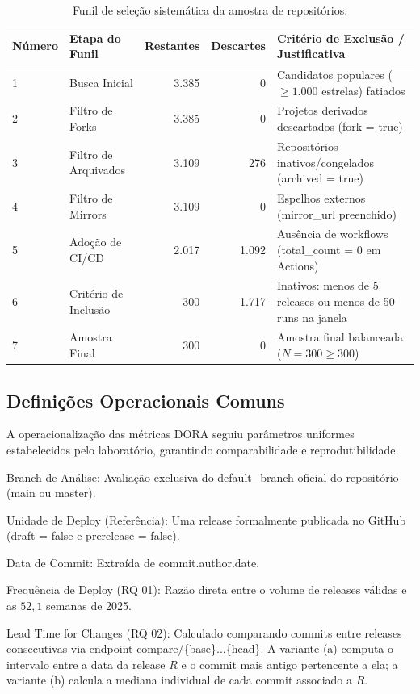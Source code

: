 \documentclass[12pt]{article}
\begin{document}
\begin{table}[htbp]
\centering
\caption{Funil de seleção sistemática da amostra de repositórios.}
\label{tab:funil}
\footnotesize
\setlength{\tabcolsep}{3pt}
\begin{tabular}{llrrp{5.5cm}}
\toprule
Número & Etapa do Funil & Restantes & Descartes & Critério de Exclusão / Justificativa \\
\midrule
1 & Busca Inicial & 3.385 & 0 & Candidatos populares ($\ge 1.000$ estrelas) fatiados \\
2 & Filtro de Forks & 3.385 & 0 & Projetos derivados descartados (fork = true) \\
3 & Filtro de Arquivados & 3.109 & 276 & Repositórios inativos/congelados (archived = true) \\
4 & Filtro de Mirrors & 3.109 & 0 & Espelhos externos (mirror\_url preenchido) \\
5 & Adoção de CI/CD & 2.017 & 1.092 & Ausência de workflows (total\_count = 0 em Actions) \\
6 & Critério de Inclusão & 300 & 1.717 & Inativos: menos de 5 releases ou menos de 50 runs na janela \\
7 & Amostra Final & 300 & 0 & Amostra final balanceada ($N = 300 \ge 300$) \\
\bottomrule
\end{tabular}
\end{table}

\subsection{Definições Operacionais Comuns}

A operacionalização das métricas DORA seguiu parâmetros uniformes estabelecidos pelo laboratório, garantindo comparabilidade e reprodutibilidade.

Branch de Análise: Avaliação exclusiva do default\_branch oficial do repositório (main ou master).

Unidade de Deploy (Referência): Uma release formalmente publicada no GitHub (draft = false e prerelease = false).

Data de Commit: Extraída de commit.author.date.

Frequência de Deploy (RQ 01): Razão direta entre o volume de releases válidas e as $52{,}1$ semanas de 2025.

Lead Time for Changes (RQ 02): Calculado comparando commits entre releases consecutivas via endpoint compare/\{base\}...\{head\}. A variante (a) computa o intervalo entre a data da release $R$ e o commit mais antigo pertencente a ela; a variante (b) calcula a mediana individual de cada commit associado a $R$.
\end{document}
